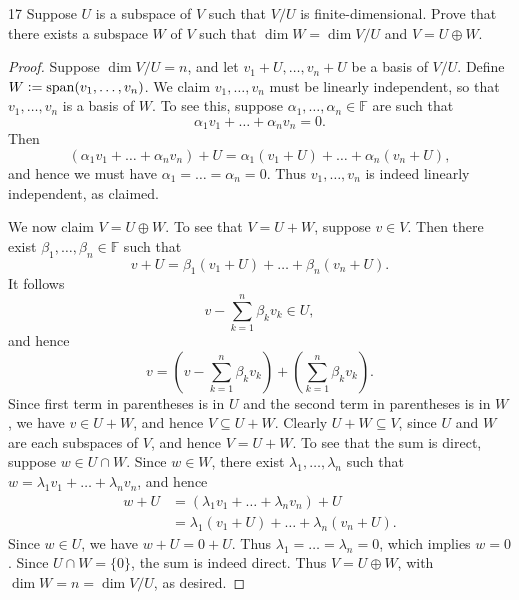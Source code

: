 \documentclass{extarticle}
\newenvironment{problem}[1]{\begin{prob*}{#1}{}}{\end{prob*}}
\newcommand{\F}{\mathbb{F}}
\DeclareMathOperator{\Span}{span}
\newcommand{\defeq}{\vcentcolon=}
\begin{document}
\begin{problem}{17}
Suppose $U$ is a subspace of $V$ such that $V/U$ is finite-dimensional.  Prove that there exists a subspace $W$ of $V$ such that $\dim W = \dim V/U$ and $V = U\oplus W$.  
\end{problem}
\begin{proof}
Suppose $\dim V/U = n$, and let $v_1 + U,\dots, v_n + U$ be a basis of $V/U$.  Define  $W \defeq \Span(v_1,\dots, v_n)$.  We claim $v_1,\dots, v_n$ must be linearly independent, so that $v_1,\dots, v_n$ is a basis of $W$.  To see this, suppose $\alpha_1,\dots,\alpha_n\in\F$ are such that
\begin{equation*}
\alpha_1v_1 + \dots + \alpha_nv_n = 0.
\end{equation*}
Then
\begin{equation*}
(\alpha_1v_1 + \dots + \alpha_nv_n) + U = \alpha_1(v_1 + U) + \dots + \alpha_n(v_n + U),
\end{equation*}
and hence we must have $\alpha_1= \dots = \alpha_n=0$.  Thus $v_1,\dots,v_n$ is indeed linearly independent, as claimed. 
\par We now claim $V = U\oplus W$.  To see that $V = U + W$, suppose $v\in V$.  Then there exist $\beta_1,\dots, \beta_n\in\F$ such that 
\begin{equation*}
v + U = \beta_1(v_1 + U) + \dots + \beta_n(v_n + U).
\end{equation*}
It follows
\begin{equation*}
v - \sum_{k=1}^n\beta_kv_k\in U,
\end{equation*}
and hence
\begin{equation*}
v = \left(v - \sum_{k=1}^n\beta_kv_k\right) + \left(\sum_{k=1}^n\beta_kv_k\right).
\end{equation*}
Since first term in parentheses is in $U$ and the second term in parentheses is in $W$, we have $v \in U + W$, and hence $V \subseteq U + W$.  Clearly $U + W\subseteq V$, since $U$ and $W$ are each subspaces of $V$, and hence $V = U + W$.  To see that the sum is direct, suppose $w\in U \cap W$.  Since $w\in W$, there exist $\lambda_1,\dots,\lambda_n$ such that $w = \lambda_1v_1 + \dots + \lambda_nv_n$, and hence 
\begin{align*}
w + U &= (\lambda_1v_1 + \dots + \lambda_nv_n) + U\\
&= \lambda_1(v_1 + U) + \dots + \lambda_n(v_n + U).
\end{align*}  
Since $w\in U$, we have $w + U = 0 + U$.  Thus $\lambda_1 = \dots = \lambda_n = 0$, which implies $w = 0$.  Since $U\cap W = \{0\}$, the sum is indeed direct.  Thus $V = U \oplus W$, with $\dim W = n = \dim V/U$, as desired.
\end{proof}
\end{document}
